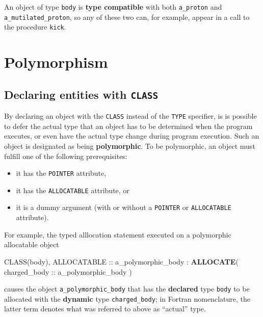 \documentclass[
  paper=a4,
  ,captions=tableheading
]{scrartcl}
\newenvironment{Shaded}{\begin{snugshade}}{\end{snugshade}}
\newcommand{\DataTypeTok}[1]{\textcolor[rgb]{0.13,0.29,0.53}{#1}}
\newcommand{\KeywordTok}[1]{\textcolor[rgb]{0.13,0.29,0.53}{\textbf{#1}}}
\newcommand{\NormalTok}[1]{#1}
\providecommand{\tightlist}{%
  \setlength{\itemsep}{0pt}\setlength{\parskip}{0pt}}
\begin{document}
An object of type \texttt{body} is \textbf{type compatible} with both
\texttt{a\_proton} and \texttt{a\_mutilated\_proton}, so any of these
two can, for example, appear in a call to the procedure \texttt{kick}.

\section{Polymorphism}\label{polymorphism}

\subsection{\texorpdfstring{Declaring entities with
\texttt{CLASS}}{Declaring entities with CLASS}}\label{declaring-entities-with-class}

By declaring an object with the \texttt{CLASS} instead of the
\texttt{TYPE} specifier, is is possible to defer the actual type that an
object has to be determined when the program executes, or even have the
actual type change during program execution. Such an object is
designated as being \textbf{polymorphic}. To be polymorphic, an object
must fulfill one of the following prerequisites:

\begin{itemize}
\tightlist
\item
  it has the \texttt{POINTER} attribute,
\item
  it has the \texttt{ALLOCATABLE} attribute, or
\item
  it is a dummy argument (with or without a \texttt{POINTER} or
  \texttt{ALLOCATABLE} attribute).
\end{itemize}

For example, the typed alllocation statement executed on a polymorphic
allocatable object

\begin{Shaded}
\begin{Highlighting}[]
\DataTypeTok{CLASS(body)}\NormalTok{, }\DataTypeTok{ALLOCATABLE} \DataTypeTok{::}\NormalTok{ a\_polymorphic\_body}
\NormalTok{:}
\KeywordTok{ALLOCATE}\NormalTok{( charged\_body }\DataTypeTok{::}\NormalTok{ a\_polymorphic\_body )}
\end{Highlighting}
\end{Shaded}

causes the object \texttt{a\_polymorphic\_body} that has the
\textbf{declared} type \texttt{body} to be allocated with the
\textbf{dynamic} type \texttt{charged\_body}; in Fortran nomenclature,
the latter term denotes what was referred to above as ``actual'' type.
\end{document}
